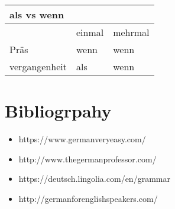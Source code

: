 \documentclass[a4paper,12pt]{article}
\begin{document}
\vspace{0.3cm}
\begin{tabular}{l|l l}

\toprule
\rowcolor{goethe_green}
\multicolumn{3}{c}
{\color{white} \textbf{als vs wenn} \color{black}} \\
\midrule

\rowcolor{white}    & einmal & mehrmal \\
\rowcolor{lightgray}Präs & wenn & wenn \\
\rowcolor{lightgray}vergangenheit & als & wenn \\


\bottomrule
\end{tabular}
\vspace{0.3cm}
\newline





\pagebreak


\section{{Bibliogrpahy}}
\label{sec:bibliogrpahy}

\begin{itemize}[noitemsep]
	\item https://www.germanveryeasy.com/
	\item http://www.thegermanprofessor.com/
	\item https://deutsch.lingolia.com/en/grammar
	\item http://germanforenglishspeakers.com/
\end{itemize}
\pagebreak
\end{document}
